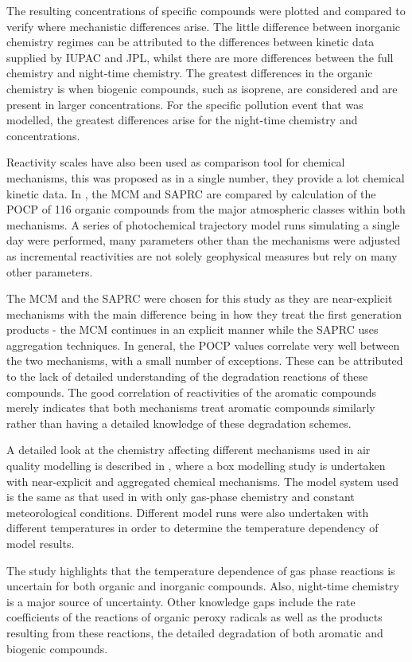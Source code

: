 The resulting concentrations of specific compounds were plotted and compared to verify where mechanistic differences arise. 
The little difference between inorganic chemistry regimes can be attributed to the differences between kinetic data supplied by IUPAC and JPL, whilst there are more differences between the full chemistry and night-time chemistry. 
The greatest differences in the organic chemistry is when biogenic compounds, such as isoprene, are considered and are present in larger concentrations. 
For the specific pollution event that was modelled, the greatest differences arise for the night-time chemistry and  concentrations.

Reactivity scales have also been used as comparison tool for chemical mechanisms, this was proposed as in a single number, they provide a lot chemical kinetic data. 
In \citep{Derwent:2010}, the MCM and SAPRC are compared by calculation of the POCP of 116 organic compounds from the major atmospheric classes within both mechanisms. 
A series of photochemical trajectory model runs simulating a single day were performed, many parameters other than the mechanisms were adjusted as incremental reactivities are not solely geophysical measures but rely on many other parameters.

The MCM and the SAPRC were chosen for this study as they are near-explicit mechanisms with the main difference being in how they treat the first generation products - the MCM continues in an explicit manner while the SAPRC uses aggregation techniques. 
In general, the POCP values correlate very well between the two mechanisms, with a small number of exceptions. 
These can be attributed to the lack of detailed understanding of the degradation reactions of these compounds. 
The good correlation of reactivities of the aromatic compounds merely indicates that both mechanisms treat aromatic compounds similarly rather than having a detailed knowledge of these degradation schemes.

A detailed look at the chemistry affecting different mechanisms used in air quality modelling is described in \citep{Stockwell:2012}, where a box modelling study is undertaken with near-explicit and aggregated chemical mechanisms. 
The model system used is the same as that used in \citep{Seefeld:1999} with only gas-phase chemistry and constant meteorological conditions.  
Different model runs were also undertaken with different temperatures in order to determine the temperature dependency of model results. 

The study highlights that the temperature dependence of gas phase reactions is uncertain for both organic and inorganic compounds. 
Also, night-time chemistry is a major source of uncertainty. 
Other knowledge gaps include the rate coefficients of the reactions of organic peroxy radicals as well as the products resulting from these reactions, the detailed degradation of both aromatic and biogenic compounds.  
